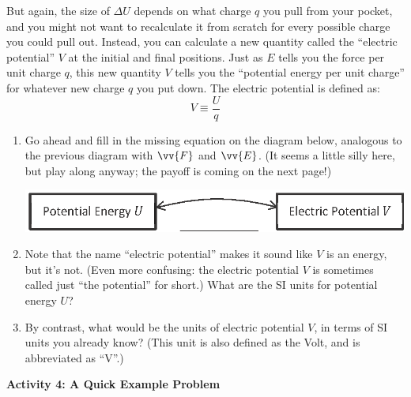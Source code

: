 But again, the size of $\Delta U$ depends on what charge $q$ you pull from your pocket, and you might not want to recalculate it from scratch for every possible charge you could pull out.  Instead, you can calculate a new quantity called the ``electric potential'' $V$ at the initial and final positions.  Just as $E$ tells you the force per unit charge $q$, this new quantity $V$ tells you the ``potential energy per unit charge'' for whatever new charge $q$ you put down.  The electric potential is defined as:
$$V \equiv \frac{U}{q}$$
\vspace{-0.3 in}
\begin{enumerate}[wide, label=(\emph{\alph*})]

\item Go ahead and fill in the missing equation on the diagram below, analogous to the previous diagram with $\vv{F}$ and $\vv{E}$.  (It seems a little silly here, but play along anyway; the payoff is coming on the next page!)
\begin{center}
\includegraphics{potential_intro/concept_map_figs/concept_map_U_and_V_blank.eps}
\end{center}

\item Note that the name ``electric potential'' makes it sound like $V$ is an energy, but it's not.  (Even more confusing: the electric potential $V$ is sometimes called just ``the potential'' for short.)  What are the SI units for potential energy $U$?  
\answerspace{0.3in}

\item By contrast, what would be the units of electric potential $V$, in terms of SI units you already know?  (This unit is also defined as the Volt, and is abbreviated as ``V''.)
\answerspace{0.3in}

\end{enumerate}

\pagebreak[2]
\textbf{Activity 4: A Quick Example Problem}

